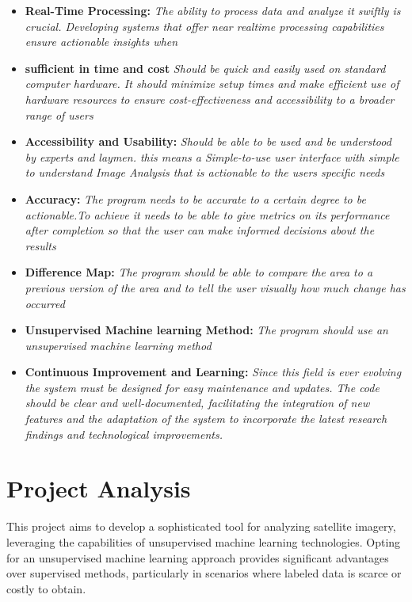 \begin{itemize}
    \item \textbf{Real-Time Processing:}
    \textit{ The ability to process data and analyze it swiftly is crucial. Developing systems that offer near realtime processing capabilities ensure actionable insights when }
    \item \textbf{sufficient in time and cost }
    \textit{Should be quick and easily used on standard computer hardware. It should minimize setup times and make
    efficient use of hardware resources to ensure cost-effectiveness and accessibility to a broader range of users}
    \item \textbf{Accessibility and Usability:}
    \textit{Should be able to be used and be understood by experts and laymen. this means a Simple-to-use user interface with
    simple to understand Image Analysis that is actionable to the users specific needs}
    \item \textbf{Accuracy:}
    \textit{The program needs to be accurate to a certain degree to be actionable.To achieve it needs to be able
    to give metrics on its performance after completion so that the user can make informed decisions about the results}
    \item \textbf{Difference Map:}
    \textit{The program should be able to compare the area to a previous version of the area and to tell the user visually how much change has occurred}
    \item \textbf{Unsupervised Machine learning Method:}
    \textit{The program should use an unsupervised machine learning method}
    \item \textbf{Continuous Improvement and Learning:}
    \textit{Since this field is ever evolving the system must be designed for easy maintenance and updates. The code should be clear and well-documented,
        facilitating the integration of new features and the adaptation of the system to incorporate the latest research findings and technological improvements.}
\end{itemize}

\section{ Project Analysis}\label{sec:project-analysis}

This project aims to develop a sophisticated tool for analyzing satellite imagery, leveraging the capabilities of unsupervised machine learning technologies.
Opting for an unsupervised machine learning approach provides significant advantages over supervised methods,
particularly in scenarios where labeled data is scarce or costly to obtain.

